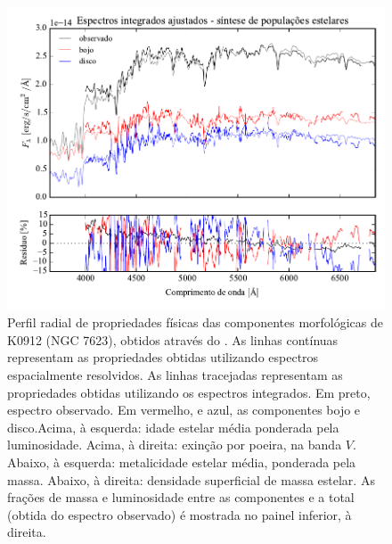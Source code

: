\begin{figure}
	\includegraphics[page=18]{figuras/sample006a_synthesis}
	\caption[Propriedades físicas das componentes morfológicas de K0912 (NGC 7623)]
	{Perfil radial de propriedades físicas das componentes morfológicas de
	K0912 (NGC 7623), obtidos através do \starlight. As linhas contínuas
	representam as propriedades obtidas utilizando espectros espacialmente
	resolvidos. As linhas tracejadas representam as propriedades obtidas utilizando
	os espectros integrados. Em preto, espectro observado. Em vermelho, e azul, as
	componentes bojo e disco.Acima, à esquerda: idade estelar média ponderada pela
	luminosidade. Acima, à direita: exinção por poeira, na banda $V$. Abaixo, à
	esquerda: metalicidade estelar média, ponderada pela massa. Abaixo, à direita:
	densidade superficial de massa estelar. As frações de massa e luminosidade
	entre as componentes e a total (obtida do espectro observado) é mostrada no
	painel inferior, à direita.}
	\label{fig:decompSinteseRadprof:K0912}
\end{figure}

